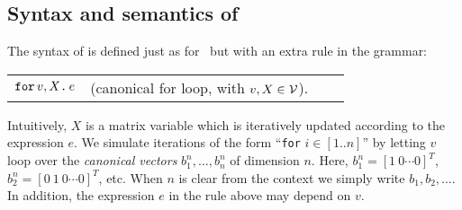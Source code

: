 %
%
%

\subsection{Syntax and semantics of \langfor} The syntax of \langfor is defined just as for \lang\, but with an extra rule in the grammar:
\medskip

\begin{tabular}{lcll}
 $\texttt{for}\, v,X \texttt{.}\, e$ & (canonical for loop, with $v, X \in \mathcal{V}$). 
\end{tabular}

\medskip
Intuitively, $X$ is a matrix variable which is iteratively updated according to the expression $e$. We simulate iterations of the form ``\texttt{for} $i\in [1..n]$'' by letting $v$ loop over the \textit{canonical vectors} $b_1^n,\ldots,b_n^n$ of dimension $n$. Here,
%
$b_1^n = [1\ 0 \cdots 0]^T$, $b_2^n = [0\ 1\ 0 \cdots 0]^T$, etc. When $n$ is clear from the context we simply write $b_1,b_2,\ldots$. In addition, the expression $e$ in the rule above may depend on $v$. 

